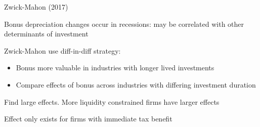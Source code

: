 \documentclass[11pt, aspectratio=169]{beamer}
\newenvironment{witemize}{\itemize\addtolength{\itemsep}{10pt}}{\enditemize}
\begin{document}
\begin{frame}{Zwick-Mahon (2017)}
\begin{witemize}
\item Bonus depreciation changes occur in recessions: may be correlated with other determinants of investment

\item Zwick-Mahon use diff-in-diff strategy:
\begin{itemize}
	\item Bonus more valuable in industries with longer lived investments
	\item Compare effects of bonus across industries with differing investment duration
\end{itemize}

\item Find large effects. More liquidity constrained firms have larger effects

\item Effect only exists for firms with immediate tax benefit

\end{witemize}
\end{frame}
\end{document}
